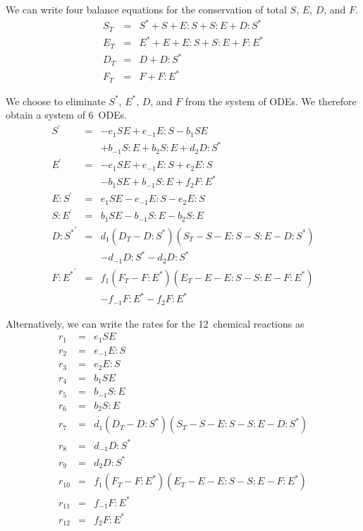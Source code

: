 We can write four balance equations for the conservation of total $S$, $E$, $D$, and $F$.
\begin{equation}
    \begin{array}{rcl}
        S_T & = & S^{*} + S + E:S + S:E + D:S^{*} \\
        E_T & = & E^{*} + E + E:S + S:E + F:E^{*} \\
        D_T & = & D + D:S^{*} \\
        F_T & = & F + F:E^{*}
    \end{array}
\end{equation}

We choose to eliminate $S^{*}$, $E^{*}$, $D$, and $F$ from the system of ODEs.
%
We therefore obtain a system of 6~ODEs.
\begin{equation}
    \begin{array}{rcl}
        S^\prime & = & -e_1 S E + e_{-1} E:S -b_1 S E \\
                        &   & + b_{-1} S:E + b_2 S:E + d_2 D:S^{*} \\
        E^\prime & = & -e_1 S E + e_{-1} E:S + e_2 E:S \\
                        &   & - b_1 S E +b_{-1} S:E + f_2 F:E^{*} \\
        E:S^\prime  & = & e_1 S E -e_{-1} E:S -e_2 E:S \\
        S:E^\prime & = & b_1 S E -b_{-1} S:E -b_2 S:E \\
        {D:S^{*}}^\prime & = & d_1 (D_T - D:S^{*}) (S_T - S - E:S - S:E - D:S^{*}) \\
        & &  - d_{-1} D:S^{*} -d_2 D:S^{*} \\
        {F:E^{*}}^\prime & = & f_1 (F_T - F:E^{*}) (E_T - E - E:S - S:E - F:E^{*}) \\
         && - f_{-1} F:E^{*} -f_2 F:E^{*}
    \end{array}
\end{equation}

Alternatively, we can write the rates for the 12~chemical reactions as
\begin{equation}
    \begin{array}{rcl}
        r_1 & = & e_1 S E \\
        r_2 & = & e_{-1} E:S \\
        r_3 & = & e_2 E:S \\
        r_4 & = & b_1 S E \\
        r_5 & = & b_{-1} S:E \\
        r_6 & = & b_2 S:E \\
        r_7 & = & d_1 (D_T - D:S^{*}) (S_T - S - E:S - S:E - D:S^{*}) \\
        r_8 & = & d_{-1} D:S^{*} \\
        r_9 & = & d_2 D:S^{*} \\
        r_{10} & = & f_1 (F_T - F:E^{*}) (E_T - E - E:S - S:E - F:E^{*}) \\
        r_{11} & = & f_{-1} F:E^{*} \\
        r_{12} & = & f_2 F:E^{*}
    \end{array}
\end{equation}

